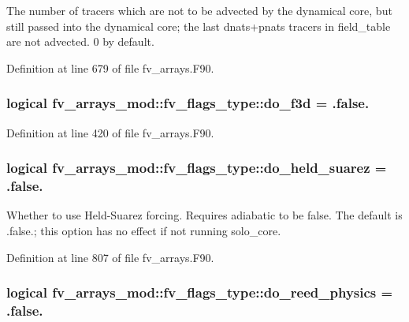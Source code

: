 The number of tracers which are not to be advected by the dynamical core, but still passed into the dynamical core; the last dnats+pnats tracers in field\-\_\-table are not advected. 0 by default. 



Definition at line 679 of file fv\-\_\-arrays.\-F90.

\subsubsection[{do\-\_\-f3d}]{\setlength{\rightskip}{0pt plus 5cm}logical fv\-\_\-arrays\-\_\-mod\-::fv\-\_\-flags\-\_\-type\-::do\-\_\-f3d = .false.}\label{structfv__arrays__mod_1_1fv__flags__type_a9cfcad9b998983b7a1e1d89ea1c76022}


Definition at line 420 of file fv\-\_\-arrays.\-F90.

\subsubsection[{do\-\_\-held\-\_\-suarez}]{\setlength{\rightskip}{0pt plus 5cm}logical fv\-\_\-arrays\-\_\-mod\-::fv\-\_\-flags\-\_\-type\-::do\-\_\-held\-\_\-suarez = .false.}\label{structfv__arrays__mod_1_1fv__flags__type_a34c703efb3ef0937e06ef5bf9b450a7f}


Whether to use Held-\/\-Suarez forcing. Requires adiabatic to be false. The default is .false.; this option has no effect if not running solo\-\_\-core. 



Definition at line 807 of file fv\-\_\-arrays.\-F90.

\subsubsection[{do\-\_\-reed\-\_\-physics}]{\setlength{\rightskip}{0pt plus 5cm}logical fv\-\_\-arrays\-\_\-mod\-::fv\-\_\-flags\-\_\-type\-::do\-\_\-reed\-\_\-physics = .false.}\label{structfv__arrays__mod_1_1fv__flags__type_ad305f75672841755e41c89f48a78377f}


